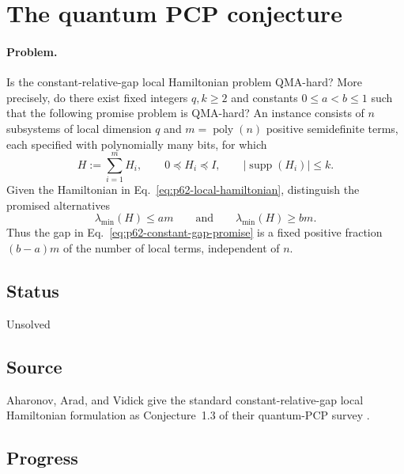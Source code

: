 \section{The quantum PCP conjecture}
\label{sec:op_bca77ec42ddd1d5c}

\paragraph{Problem.}
Is the constant-relative-gap local Hamiltonian problem QMA-hard?  More
precisely, do there exist fixed integers $q,k\geq2$ and constants
$0\leq a<b\leq1$ such that the following promise problem is QMA-hard?  An
instance consists of $n$ subsystems of local dimension $q$ and
$m=\operatorname{poly}(n)$ positive semidefinite terms, each specified with
polynomially many bits, for which
\begin{equation}
  H:=\sum_{i=1}^{m}H_i,
  \qquad
  0\preceq H_i\preceq I,
  \qquad
  \lvert\operatorname{supp}(H_i)\rvert\leq k.
  \label{eq:p62-local-hamiltonian}
\end{equation}
Given the Hamiltonian in Eq.~\eqref{eq:p62-local-hamiltonian}, distinguish
the promised alternatives
\begin{equation}
  \lambda_{\min}(H)\leq am
  \qquad\text{and}\qquad
  \lambda_{\min}(H)\geq bm.
  \label{eq:p62-constant-gap-promise}
\end{equation}
Thus the gap in Eq.~\eqref{eq:p62-constant-gap-promise} is a fixed positive
fraction $(b-a)m$ of the number of local terms, independent of $n$.

\subsection*{Status}

Unsolved

\subsection*{Source}

Aharonov, Arad, and Vidick give the standard constant-relative-gap local
Hamiltonian formulation as Conjecture~1.3 of their quantum-PCP survey
.

\subsection*{Progress}

